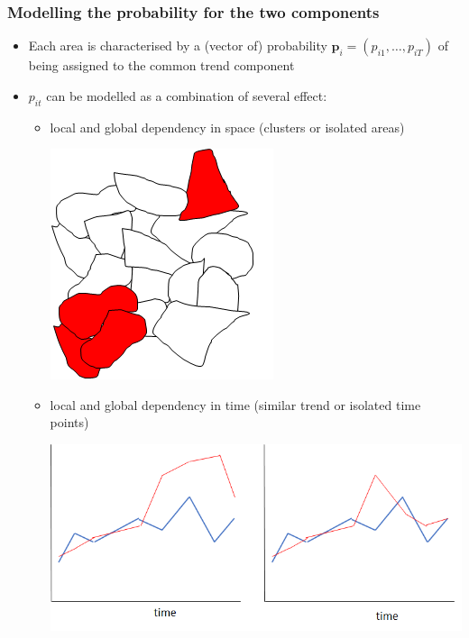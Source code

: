 \documentclass[slidestop,compress,serif,10pt]{beamer}
\begin{document}
\begin{frame}
\frametitle{Modelling the probability for the two components}
\begin{itemize}
\item Each area is characterised by a (vector of) probability $\bm p_{i}=\left( p_{i1}, \ldots, p_{iT} \right)$ of being assigned to the common trend component
\item $p_{it}$ can be modelled as a combination of several effect:
\begin{itemize}
\item local and global dependency in space (clusters or isolated areas)\\
\begin{center}\includegraphics[scale=0.3]{Cluster.png}\end{center}
\item local and global dependency in time (similar trend or isolated time points)\\
\begin{center}\includegraphics[scale=0.3]{TimeCluster.png}\end{center}
\end{itemize}
\end{itemize}
\end{frame}
\end{document}
